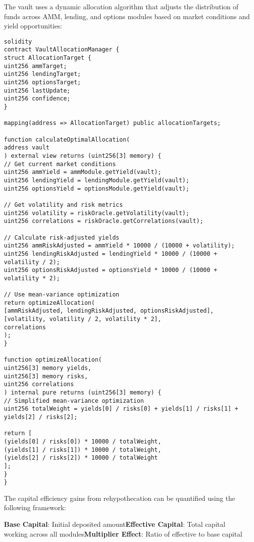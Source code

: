 \documentclass[12pt]{article}
\begin{document}
{{{ %

The vault uses a dynamic allocation algorithm that adjusts the distribution of funds across AMM, lending, and options modules based on market conditions and yield opportunities:


\begin{lstlisting}
solidity
contract VaultAllocationManager {
struct AllocationTarget {
uint256 ammTarget;
uint256 lendingTarget;
uint256 optionsTarget;
uint256 lastUpdate;
uint256 confidence;
}

mapping(address => AllocationTarget) public allocationTargets;

function calculateOptimalAllocation(
address vault
) external view returns (uint256[3] memory) {
// Get current market conditions
uint256 ammYield = ammModule.getYield(vault);
uint256 lendingYield = lendingModule.getYield(vault);
uint256 optionsYield = optionsModule.getYield(vault);

// Get volatility and risk metrics
uint256 volatility = riskOracle.getVolatility(vault);
uint256 correlations = riskOracle.getCorrelations(vault);

// Calculate risk-adjusted yields
uint256 ammRiskAdjusted = ammYield * 10000 / (10000 + volatility);
uint256 lendingRiskAdjusted = lendingYield * 10000 / (10000 + volatility / 2);
uint256 optionsRiskAdjusted = optionsYield * 10000 / (10000 + volatility * 2);

// Use mean-variance optimization
return optimizeAllocation(
[ammRiskAdjusted, lendingRiskAdjusted, optionsRiskAdjusted],
[volatility, volatility / 2, volatility * 2],
correlations
);
}

function optimizeAllocation(
uint256[3] memory yields,
uint256[3] memory risks,
uint256 correlations
) internal pure returns (uint256[3] memory) {
// Simplified mean-variance optimization
uint256 totalWeight = yields[0] / risks[0] + yields[1] / risks[1] + yields[2] / risks[2];

return [
(yields[0] / risks[0]) * 10000 / totalWeight,
(yields[1] / risks[1]) * 10000 / totalWeight,
(yields[2] / risks[2]) * 10000 / totalWeight
];
}
}
\end{lstlisting}


The capital efficiency gains from rehypothecation can be quantified using the following framework:

\textbf{Base Capital}: Initial deposited amount\textbf{Effective Capital}: Total capital working across all modules\textbf{Multiplier Effect}: Ratio of effective to base capital

}}}
\end{document}
